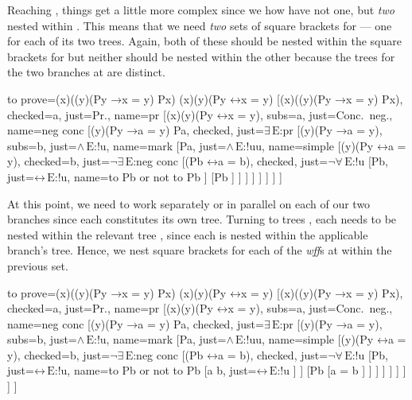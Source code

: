 \documentclass[10pt,british,a4paper]{ltxdoc}
\newcommand*{\lif}{\ensuremath{\mathbin{\rightarrow}}}
\newcommand*{\liff}{\ensuremath{\mathbin{\leftrightarrow}}}
\newcommand*{\elim}{\,\text{E}}
\newcommand*\wff{\emph{wff}}
\begin{document}
Reaching \nyth*{}, things get a little more complex since we how have not one, but \emph{two} \bocsnyth{} nested within \nyth[7].
This means that we need \emph{two} sets of square brackets for \nyth{} --- one for each of its two trees.
Again, both of these should be nested within the square brackets for \nyth[7] but neither should be nested within the other because the trees for the two branches at \nyth{} are distinct.
\begin{latexcode}
\begin{prooftree}
  {
    to prove={(\exists x)((\forall y)(Py \lif x = y) \land Px) \sststile{}{} (\exists x)(\forall y)(Py \liff x = y)}
  }
  [{(\exists x)((\forall y)(Py \lif x = y) \land Px)}, checked=a, just=Pr., name=pr
    [{\lnot (\exists x)(\forall y)(Py \liff x = y)}, subs=a, just=Conc.~neg., name=neg conc
      [{(\forall y)(Py \lif a = y) \land Pa}, checked, just=$\exists\elim$:pr
        [{(\forall y)(Py \lif a = y)}, subs=b, just=$\land\elim$:!u, name=mark
          [Pa, just=$\land\elim$:!uu, name=simple
            [{\lnot (\forall y)(Py \liff a = y)}, checked=b, just=$\lnot\exists\elim$:neg conc
              [{\lnot (Pb \liff a = b)}, checked, just=$\lnot\forall\elim$:!u
                [Pb, just=$\liff\elim$:!u, name=to Pb or not to Pb
                ]
                [\lnot Pb
                ]
              ]
            ]
          ]
        ]
      ]
    ]
  ]
\end{prooftree}
\end{latexcode}

At this point, we need to work separately or in parallel on each of our two branches since each constitutes its own tree.
Turning to trees \nyth*{}, each needs to be nested within the relevant tree \nyth[8], since each \bocsnyth{} is nested within the applicable branch's tree.
Hence, we nest square brackets for each of the \wff{}s at \nyth{} within the previous set.
\begin{latexcode}
\begin{prooftree}
  {
    to prove={(\exists x)((\forall y)(Py \lif x = y) \land Px) \sststile{}{} (\exists x)(\forall y)(Py \liff x = y)}
  }
  [{(\exists x)((\forall y)(Py \lif x = y) \land Px)}, checked=a, just=Pr., name=pr
    [{\lnot (\exists x)(\forall y)(Py \liff x = y)}, subs=a, just=Conc.~neg., name=neg conc
      [{(\forall y)(Py \lif a = y) \land Pa}, checked, just=$\exists\elim$:pr
        [{(\forall y)(Py \lif a = y)}, subs=b, just=$\land\elim$:!u, name=mark
          [Pa, just=$\land\elim$:!uu, name=simple
            [{\lnot (\forall y)(Py \liff a = y)}, checked=b, just=$\lnot\exists\elim$:neg conc
              [{\lnot (Pb \liff a = b)}, checked, just=$\lnot\forall\elim$:!u
                [Pb, just=$\liff\elim$:!u, name=to Pb or not to Pb
                 [a \neq b, just=$\liff\elim$:!u
                 ]
                ]
                [\lnot Pb
                 [{a = b}
                 ]
                ]
              ]
            ]
          ]
        ]
      ]
    ]
  ]
\end{prooftree}
\end{latexcode}
\end{document}
